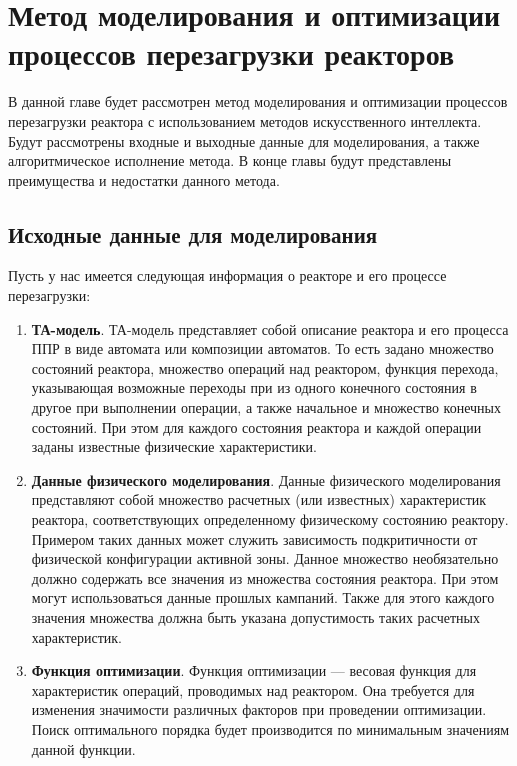 \chapter{Метод моделирования и оптимизации процессов перезагрузки реакторов}

В данной главе будет рассмотрен метод моделирования и оптимизации процессов перезагрузки реактора с использованием методов искусственного интеллекта.
Будут рассмотрены входные и выходные данные для моделирования, а также алгоритмическое исполнение метода.
В конце главы будут представлены преимущества и недостатки данного метода.

\section{Исходные данные для моделирования}

Пусть у нас имеется следующая информация о реакторе и его процессе перезагрузки:
\begin{enumerate}
 \item \textbf{ТА-модель}. 
 ТА-модель представляет собой описание реактора и его процесса ППР в виде автомата или композиции автоматов.
 То есть задано множество состояний реактора, множество операций над реактором, функция перехода, указывающая возможные переходы при из одного конечного состояния в другое при выполнении операции, а также начальное и множество конечных состояний.
 При этом для каждого состояния реактора и каждой операции заданы известные физические характеристики.
 
 \item \textbf{Данные физического моделирования}. 
 Данные физического моделирования представляют собой множество расчетных (или известных) характеристик реактора, соответствующих определенному физическому состоянию реактору.
 Примером таких данных может служить зависимость подкритичности от физической конфигурации активной зоны.
 Данное множество необязательно должно содержать все значения из множества состояния реактора.
 При этом могут использоваться данные прошлых кампаний.
 Также для этого каждого значения множества должна быть указана допустимость таких расчетных характеристик.
 
 \item \textbf{Функция оптимизации}.
 Функция оптимизации --- весовая функция для характеристик операций, проводимых над реактором.
 Она требуется для изменения значимости различных факторов при проведении оптимизации.
 Поиск оптимального порядка будет производится по минимальным значениям данной функции. 
\end{enumerate}

